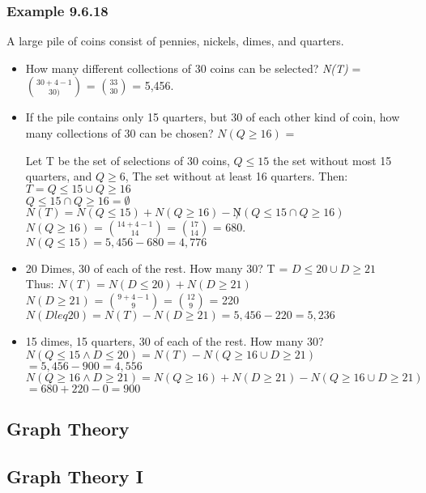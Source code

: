 \documentclass{article}
\begin{document}
\subsubsection*{Example 9.6.18}
A large pile of coins consist of pennies, nickels, dimes, and quarters.
\begin{itemize}
    \item How many different collections of 30 coins can be selected? \textit{N(T)} = $30 + 4 - 1 \choose 30)$ = $33 \choose 30$ = 5,456.
    \item If the pile contains only 15 quarters, but 30 of each other kind of coin, how many collections of 30 can be chosen? $N(Q \geq 16)$ = %

    Let T be the set of selections of 30 coins, $Q \leq 15$ the set without most 15 quarters, and $Q \geq 6$, The set without at least 16 quarters. Then: \\

    \noindent
    $T = Q \leq 15 \cup Q \geq 16$ \\
    $Q \leq 15 \cap Q \geq 16 = \emptyset$ \\
    $N(T) = N(Q \leq 15) + N(Q \geq 16) - \not N(Q \leq 15 \cap Q \geq 16) $ \\
    $N(Q \geq 16)$ = $14 + 4 - 1 \choose 14$ = $17 \choose 14$ = 680. \\
    $N(Q \leq 15) = 5,456 - 680 = 4,776$ \\

    \item 20 Dimes, 30 of each of the rest. How many 30?
    T = $D \leq 20  \cup D \geq 21$ \\
    Thus: $N(T) = N(D \leq 20) + N(D \geq 21)$ \\
    $N(D \geq 21)$ = $9 + 4 - 1 \choose 9$ = $12 \choose 9$ = 220 \\
    $N(D leq 20) = N(T) - N(D\geq 21) = 5,456 - 220 = 5,236$ \\

    \item 15 dimes, 15 quarters, 30 of each of the rest. How many 30?
    $N(Q \leq 15 \wedge D \leq 20) = N(T) - N(Q \geq 16 \cup D \geq 21)$ \\
    $= 5,456 - 900 = 4,556$ \\

    $N(Q \geq 16 \wedge D \geq 21) = N(Q \geq 16) + N(D \geq 21) - N(Q \geq 16 \cup D \geq 21)$ \\
    $= 680 + 220 - 0 = 900$ \\

\end{itemize}
\setcounter{section}{9}
\subsection{Graph Theory}
\subsection{Graph Theory I}
\end{document}

